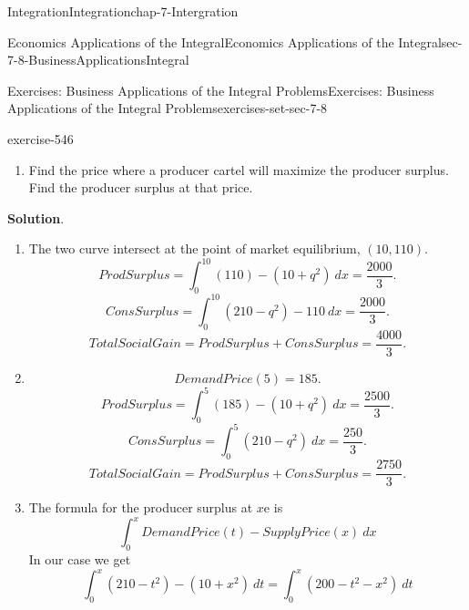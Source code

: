 \documentclass[oneside,10pt,]{book}
\numberwithin{equation}{section}
\begin{document}
\begin{chapterptx}{Integration}{}{Integration}{}{}{chap-7-Intergration}
\begin{sectionptx}{Economics Applications of the Integral}{}{Economics Applications of the Integral}{}{}{sec-7-8-BusinessApplicationsIntegral}
\begin{exercises-subsection-numberless}{Exercises: Business Applications of the Integral Problems}{}{Exercises: Business Applications of the Integral Problems}{}{}{exercises-set-sec-7-8}
\begin{divisionexercise}{9}{}{}{exercise-546}
\begin{enumerate}[label=(\alph*)]
If the producers can form a cartel and restrict the available quantity to 5, selling at the demand price for 5 (for a price of 185), what are the consumer surplus, producer surplus, and total social gain?%
\item\hypertarget{li-810}{}\hypertarget{p-3152}{}%
Find the price where a producer cartel will maximize the producer surplus.  Find the producer surplus at that price.%
\end{enumerate}
\par\smallskip%
\noindent\textbf{Solution}.\hypertarget{solution-276}{}\quad%
\leavevmode%
\begin{enumerate}[label=(\alph*)]
\item\hypertarget{li-811}{}\hypertarget{p-3153}{}%
The two curve intersect at the point of market equilibrium, \((10, 110)\).%
%
\begin{equation*}
ProdSurplus=
\int_0^{10}
(110)-
(10+q^2)\ dx=\frac{2000}{3}.
\end{equation*}
%
\begin{equation*}
ConsSurplus=
\int_0^{10}
(210-q^2)-110\ dx=\frac{2000}{3}.
\end{equation*}
%
\begin{equation*}
TotalSocialGain=ProdSurplus+ConsSurplus=\frac{4000}{3}.
\end{equation*}
\item\hypertarget{li-812}{}%
\begin{equation*}
DemandPrice(5)=185.
\end{equation*}
%
\begin{equation*}
ProdSurplus=
\int_0^{5}
(185)-
(10+q^2)\ dx=\frac{2500}{3}.
\end{equation*}
%
\begin{equation*}
ConsSurplus=
\int_0^{5}
(210-q^2)\ dx=\frac{250}{3}.
\end{equation*}
%
\begin{equation*}
TotalSocialGain=ProdSurplus+ConsSurplus=\frac{2750}{3}.
\end{equation*}
%
\item\hypertarget{li-813}{}\hypertarget{p-3154}{}%
The formula for the producer surplus at \(x\)e is%
%
\begin{equation*}
\int_0^x DemandPrice(t)-SupplyPrice(x)\ dx
\end{equation*}
\hypertarget{p-3155}{}%
In our case we get%
%
\begin{equation*}
\int_0^x (210-t^2)-(10+x^2) \ dt=\int_0^x(200-t^2-x^2) \ dt
\end{equation*}

\end{enumerate}
\end{divisionexercise}
\end{exercises-subsection-numberless}
\end{sectionptx}
\end{chapterptx}
\end{document}
